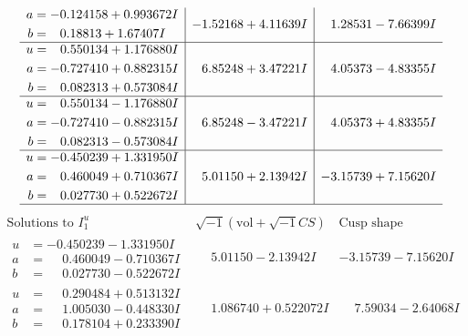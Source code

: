 \documentclass[1p]{elsarticle_modified}
\theoremstyle{definition}
\newcommand{\I}{\sqrt{-1}}
\begin{document}
$$\begin{array}{c|c|c}
\begin{aligned}
a &= -0.124158 + 0.993672 I \\
b &= \phantom{-}0.18813 + 1.67407 I\end{aligned}
 & -1.52168 + 4.11639 I & \phantom{-}1.28531 - 7.66399 I \\ \hline\begin{aligned}
u &= \phantom{-}0.550134 + 1.176880 I \\
a &= -0.727410 + 0.882315 I \\
b &= \phantom{-}0.082313 + 0.573084 I\end{aligned}
 & \phantom{-}6.85248 + 3.47221 I & \phantom{-}4.05373 - 4.83355 I \\ \hline\begin{aligned}
u &= \phantom{-}0.550134 - 1.176880 I \\
a &= -0.727410 - 0.882315 I \\
b &= \phantom{-}0.082313 - 0.573084 I\end{aligned}
 & \phantom{-}6.85248 - 3.47221 I & \phantom{-}4.05373 + 4.83355 I \\ \hline\begin{aligned}
u &= -0.450239 + 1.331950 I \\
a &= \phantom{-}0.460049 + 0.710367 I \\
b &= \phantom{-}0.027730 + 0.522672 I\end{aligned}
 & \phantom{-}5.01150 + 2.13942 I & -3.15739 + 7.15620 I\\
 \hline 
 \end{array}$$\newpage$$\begin{array}{c|c|c}  
\text{Solutions to }I^u_{1}& \I (\text{vol} + \sqrt{-1}CS) & \text{Cusp shape}\\
 \hline 
\begin{aligned}
u &= -0.450239 - 1.331950 I \\
a &= \phantom{-}0.460049 - 0.710367 I \\
b &= \phantom{-}0.027730 - 0.522672 I\end{aligned}
 & \phantom{-}5.01150 - 2.13942 I & -3.15739 - 7.15620 I \\ \hline\begin{aligned}
u &= \phantom{-}0.290484 + 0.513132 I \\
a &= \phantom{-}1.005030 - 0.448330 I \\
b &= \phantom{-}0.178104 + 0.233390 I\end{aligned}
 & \phantom{-}1.086740 + 0.522072 I & \phantom{-}7.59034 - 2.64068 I \\ \hline\begin{aligned}

\end{aligned}
\end{array}$$
\end{document}
